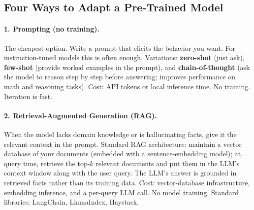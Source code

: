 \documentclass[11pt]{article}
\theoremstyle{remark}
\begin{document}
\subsection{Four Ways to Adapt a Pre-Trained Model}

\paragraph{1. Prompting (no training).}
The cheapest option. Write a prompt that elicits the behavior you want. For instruction-tuned models this is often enough. Variations: \textbf{zero-shot} (just ask), \textbf{few-shot} (provide worked examples in the prompt), and \textbf{chain-of-thought} (ask the model to reason step by step before answering; improves performance on math and reasoning tasks). Cost: API tokens or local inference time. No training. Iteration is fast.

\paragraph{2. Retrieval-Augmented Generation (RAG).}
When the model lacks domain knowledge or is hallucinating facts, give it the relevant context in the prompt. Standard RAG architecture: maintain a vector database of your documents (embedded with a sentence-embedding model); at query time, retrieve the top-\(k\) relevant documents and put them in the LLM's context window along with the user query. The LLM's answer is grounded in retrieved facts rather than its training data. Cost: vector-database infrastructure, embedding inference, and a per-query LLM call. No model training. Standard libraries: LangChain, LlamaIndex, Haystack.
\end{document}
